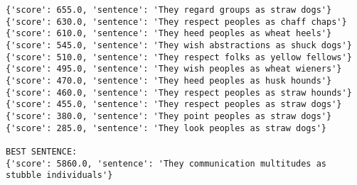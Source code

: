 \documentclass[12pt,a4paper,oneside]{book}
\begin{document}
\begin{verbatim}
{'score': 655.0, 'sentence': 'They regard groups as straw dogs'}
{'score': 630.0, 'sentence': 'They respect peoples as chaff chaps'}
{'score': 610.0, 'sentence': 'They heed peoples as wheat heels'}
{'score': 545.0, 'sentence': 'They wish abstractions as shuck dogs'}
{'score': 510.0, 'sentence': 'They respect folks as yellow fellows'}
{'score': 495.0, 'sentence': 'They wish peoples as wheat wieners'}
{'score': 470.0, 'sentence': 'They heed peoples as husk hounds'}
{'score': 460.0, 'sentence': 'They respect peoples as straw hounds'}
{'score': 455.0, 'sentence': 'They respect peoples as straw dogs'}
{'score': 380.0, 'sentence': 'They point peoples as straw dogs'}
{'score': 285.0, 'sentence': 'They look peoples as straw dogs'}

BEST SENTENCE:
{'score': 5860.0, 'sentence': 'They communication multitudes as stubble individuals'}



\end{verbatim}
\end{document}
